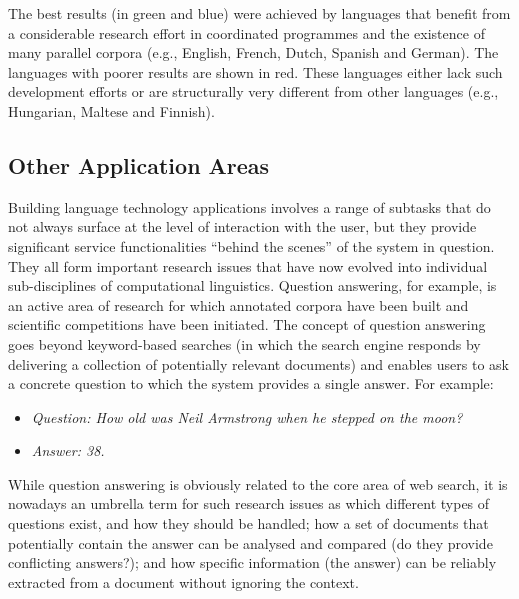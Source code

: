\begin{multicols}{2}
The best results (in green and blue) were achieved by languages that benefit from a considerable research effort in coordinated programmes and the existence of many parallel corpora (e.g., English, French, Dutch, Spanish and German). The languages with poorer results are shown in red. These languages either lack such development efforts or are structurally very different from other languages (e.g., Hungarian, Maltese and Finnish).


\subsection{Other Application Areas}

Building language technology applications involves a range of subtasks that do not always surface at the level of interaction with the user, but they provide significant service functionalities “behind the scenes” of the system in question. They all form important research issues that have now evolved into individual sub-disciplines of computational linguistics.  Question answering, for example, is an active area of research for which annotated corpora have been built and scientific competitions have been initiated. The concept of question answering goes beyond keyword-based searches (in which the search engine responds by delivering a collection of potentially relevant documents) and enables users to ask a concrete question to which the system provides a single answer. For example:

\begin{itemize}
\item[] \textit{Question: How old was Neil Armstrong when he stepped on the moon?}
\item[] \textit{Answer: 38.}
\end{itemize}

While question answering is obviously related to the core area of web search, it is nowadays an umbrella term for such research issues as which different types of questions exist, and how they should be handled; how a set of documents that potentially contain the answer can be analysed and compared (do they provide conflicting answers?); and how specific information (the answer) can be reliably extracted from a document without ignoring the context. 



\end{multicols}

